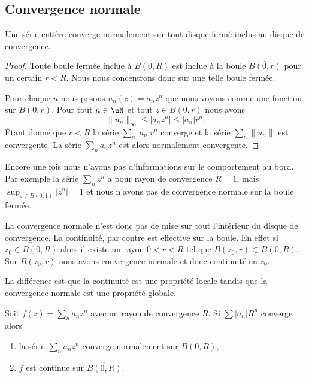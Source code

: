 \subsection{Convergence normale}

\begin{theorem}
	Une série entière converge normalement sur tout disque fermé inclus au disque de convergence.
\end{theorem}

\begin{proof}
	Toute boule fermée inclue à \( B(0,R)\) est inclue à la boule \( \overline{ B(0,r) }\) pour un certain \( r<R\). Nous nous concentrons donc sur une telle boule fermée.

	Pour chaque \( n\) nous posons \( u_n(z)=a_nz^n\) que nous voyons comme une fonction sur \( \overline{ B(0,r) }\). Pour tout \( n\in \eN\) et tout \( z\in\overline{ B(0,r) }\) nous avons
	\begin{equation}
		\| u_n \|_{\infty}\leq| a_nz^n |\leq | a_n |r^n.
	\end{equation}
	Étant donné que \( r<R\) la série \( \sum_n | a_n |r^n\) converge et la série \( \sum_n\| u_n \|\) est convergente. La série \( \sum_na_nz^n\) est alors normalement convergente.
\end{proof}

\begin{example}
	Encore une fois nous n'avons pas d'informations sur le comportement au bord. Par exemple la série \( \sum_nz^n\) a pour rayon de convergence \( R=1\), mais \( \sup_{z\in B(0,1)}| z^n |=1\) et nous n'avons pas de convergence normale sur la boule fermée.
\end{example}

La convergence normale n'est donc pas de mise sur tout l'intérieur du disque de convergence. La continuité, par contre est effective sur la boule. En effet si \( z_0\in B(0,R)\) alors il existe un rayon \( 0<r<R\) tel que \( B(z_0,r)\subset B(0,R)\). Sur \( B(z_0,r)\) nous avons convergence normale et donc continuité en \( z_0\).

La différence est que la continuité est une propriété locale tandis que la convergence normale est une propriété globale.

\begin{proposition}
	Soit \( f(z)=\sum_na_nz^n\) avec un rayon de convergence \( R\). Si \( \sum | a_n |R^n\) converge alors
	\begin{enumerate}
		\item
		      la série \( \sum_na_nz^n\) converge normalement sur \( \overline{ B(0,R) }\),
		\item
		      \( f\) est continue sur \( \overline{ B(0,R) }\).
	\end{enumerate}
\end{proposition}

